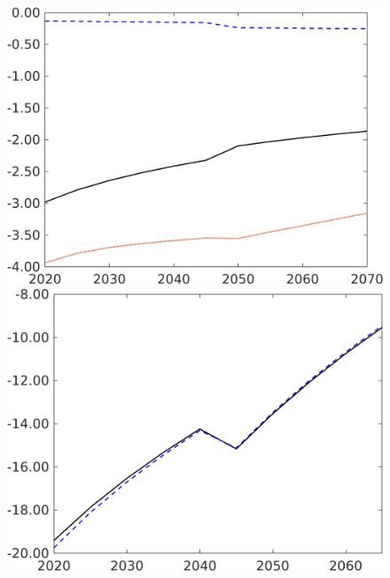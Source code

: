 \begin{figure}[h!!!]
\begin{minipage}[]{0.32\textwidth}
	\end{minipage}
	\begin{minipage}[]{0.32\textwidth}
		\includegraphics[width=1\textwidth]{../../codding_model/own_basedOnFried/optimalPol_190722_tidiedUp/figures/all_10Aout22/hl_PercentageLfDynNT_Target_regime3_spillover0_noskill0_sep1_xgrowth0_PV1_etaa0.79_lgd0.png}
	\end{minipage}
	\begin{minipage}[]{0.32\textwidth}
		\includegraphics[width=1\textwidth]{../../codding_model/own_basedOnFried/optimalPol_190722_tidiedUp/figures/all_10Aout22/gAagg_PercentageLfDynNT_noeff_Target_regime3_spillover0_noskill0_sep1_xgrowth0_PV1_etaa0.79_lgd0.png}

\end{minipage}
\end{figure}
